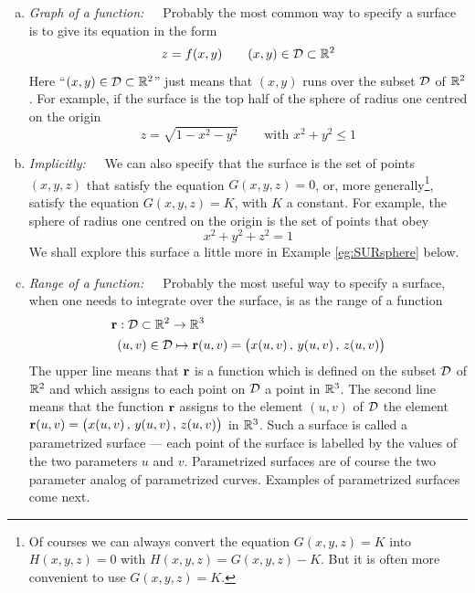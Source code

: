 \begin{enumerate}[(a)]
\item \emph{Graph of a function:}\ \ \  Probably the most common way 
to specify a surface is to give its equation in the form
\begin{equation*}
 z = f(x,y)\qquad (x,y)\in\mathcal{D}\subset\mathbb{R}^2
\end{equation*} 
Here ``{$(x,y)\in\mathcal{D}\subset\mathbb{R}^2$}'' just means that $(x,y)$ runs over the
subset $\mathcal{D}$ of $\mathbb{R}^2$.
For example, if the surface is the top half of the sphere of radius 
one centred on the origin
\begin{equation*}
 z = \sqrt{1-x^2-y^2}\qquad \text{with } x^2+y^2 \le 1
\end{equation*} 

\item \emph{Implicitly:}\ \ \ We can also specify that the surface 
is the set of points $(x,y,z)$ that satisfy the equation
$G(x,y,z)=0$, or, more generally\footnote{Of courses we can always
convert the equation $G(x,y,z)=K$ into $H(x,y,z)=0$ 
with $H(x,y,z)=G(x,y,z)-K$. But it is often more convenient to use $G(x,y,z)=K$.}, satisfy the equation $G(x,y,z)=K$,
with $K$ a constant. For example, the sphere of radius 
one centred on the origin is the set of points that obey
\begin{equation*}
x^2+y^2+z^2=1
\end{equation*}
We shall explore this surface a little more in Example
\ref{eg:SURsphere} below.

\item \emph{Range of a function:}\ \ \  Probably the most useful
way to specify a surface, when one needs to integrate over the surface,
is as the range of a function
\begin{align*}
\mathbf{r}&: \mathcal{D}\subset\mathbb{R}^2 \rightarrow \mathbb{R}^3 \\
   &(u,v) \in\mathcal{D} \mapsto \mathbf{r}(u,v) =\big(x(u,v)\,,\,y(u,v)\,,\,z(u,v)\big)
\end{align*}
The upper line means that $\mathbf{r}$ is a function which is defined on the subset
$\mathcal{D}$ of $\mathbb{R}^2$ and which assigns to each point on $\mathcal{D}$ a point 
in $\mathbb{R}^3$.
The second line means that the function $\mathbf{r}$ assigns to the element
$(u,v)$ of $\mathcal{D}$ the element  $\mathbf{r}(u,v) =\big(x(u,v)\,,\,y(u,v)\,,\,z(u,v)\big)$
in $\mathbb{R}^3$. Such a surface is called a parametrized surface --- each point 
of the surface is labelled by the values of the two parameters $u$ and $v$.
Parametrized surfaces are of course the two parameter analog of parametrized 
curves. Examples of parametrized surfaces come next. 
\end{enumerate}


